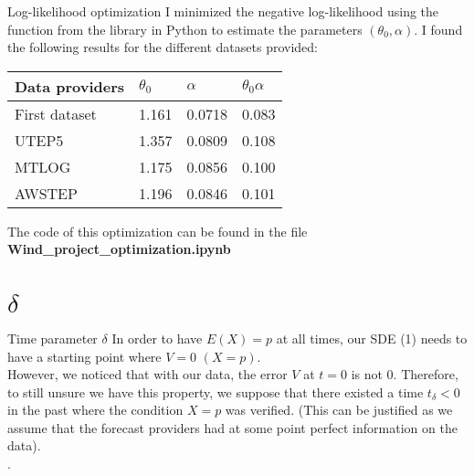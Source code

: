 \documentclass{beamer}
\begin{document}
 \begin{frame}{Log-likelihood optimization}
\justifying
 I minimized the negative log-likelihood using the function  from the library  in Python to estimate the parameters $(\theta_{0},\alpha)$. I found the following results for the different datasets provided:\\
 \begin{table}
\centering
\begin{tabular}{|l|l|l|l|} 
\hline
\textbf{Data providers} & $\theta_{0}$ & $\alpha$ & $\theta_{0}\alpha$  \\ 
\hline
First dataset                & 1.161                            & 0.0718                    & 0.083                                                  \\ 
\hline
UTEP5                   & 1.357                            & 0.0809                    & 0.108                                                  \\ 
\hline
MTLOG                   & 1.175                            & 0.0856                    & 0.100                                                  \\ 
\hline
AWSTEP                  & 1.196                            & 0.0846                    & 0.101                                                  \\
\hline
\end{tabular}
\end{table}
 \vskip 0.5cm
 The code of this optimization can be found in the file\\ \textbf{Wind\_project\_optimization.ipynb}
 \end{frame}
 
 \section{$\delta$}
 \begin{frame}{Time parameter $\delta$}
 In order to have $E(X)=p$ at all times, our SDE (1) needs to have a starting point where $V=0$ $(X=p)$.\\ \vspace{0.5cm}
 However, we noticed that with our data, the error $V$ at $t=0$ is not 0. Therefore, to still unsure we have this property, we suppose that there existed a time $t_{\delta}<0$ in the past where the condition $X=p$ was verified. (This can be justified as we assume that the forecast providers had at some point perfect information on the data).  \\ \vspace{0.5cm}.
 \end{frame}
 
\end{document}
